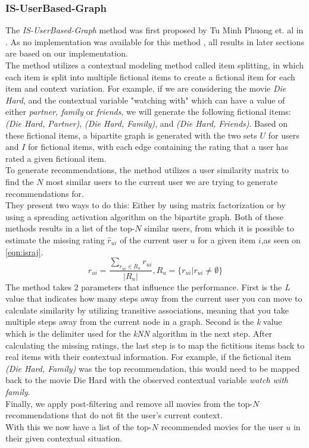 \subsubsection{IS-UserBased-Graph}\label{method:IS-UserBased-Graph}
The \textit{IS-UserBased-Graph} method was first proposed by Tu Minh Phuong et. al in \cite{GraphBasedCollaborativePaper}.
As no implementation was available for this method , all results in later sections are based on our implementation.\\
The method utilizes a contextual modeling method called item splitting, in which each item is split into multiple fictional items to create a fictional item for each item and context variation.
For example, if we are considering the movie \textit{Die Hard}, and the contextual variable "watching with" which can have a value of either \textit{partner, family} or \textit{friends}, we will generate the following fictional items: \textit{(Die Hard, Partner)}, \textit{(Die Hard, Family)}, and \textit{(Die Hard, Friends)}.
Based on these fictional items, a bipartite graph is generated with the two sets $U$ for users and $I$ for fictional items, with each edge containing the rating that a user has rated a given fictional item.\\
To generate recommendations, the method utilizes a user similarity matrix to find the $N$ most similar users to the current user we are trying to generate recommendations for.\\
They present two ways to do this: Either by using matrix factorization or by using a spreading activation algorithm on the bipartite graph.
Both of these methods results in a list of the top-$N$ similar users, from which it is possible to estimate the missing rating $\hat{r}_{ui}$ of the current user $u$ for a given item $i$,as seen on \autoref{eqn:israj}.
\begin{equation}
    \label{eqn:israj}
    \hat{r}_{ui} = \frac{\sum_{r_{ui} \in R_u} r_{ui}}{|R_u|}, R_u = \{ r_{ui} | r_{ui} \neq \emptyset\}
\end{equation}
The method takes 2 parameters that influence the performance.
First is the \textit{L} value that indicates how many steps away from the current user you can move to calculate similarity by utilizing transitive associations, meaning that you take multiple steps away from the current node in a graph.
Second is the \textit{k} value which is the delimiter used for the \textit{kNN} algorithm in the next step.
After calculating the missing ratings, the last step is to map the fictitious items back to real items with their contextual information.
For example, if the fictional item \textit{(Die Hard, Family)} was the top recommendation, this would need to be mapped back to the movie Die Hard with the observed contextual variable \textit{watch with family}.\\
Finally, we apply post-filtering and remove all movies from the top-$N$ recommendations that do not fit the user's current context.\\
With this we now have a list of the top-$N$ recommended movies for the user $u$ in their given contextual situation.
